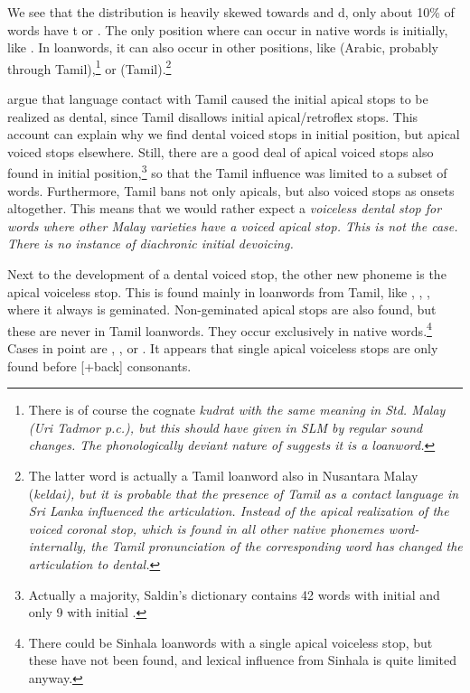 We see that the distribution is heavily skewed towards \dentt{} and d, only about 10\% of  words have t or \dentd{}.
The only position where \dentd{} can occur in native words is initially, like . In loanwords, it can also occur in other positions, like  (Arabic, probably through Tamil),\footnote{There is of course the cognate \em kudrat \em with the same meaning in Std. Malay (Uri Tadmor p.c.), but this should have given  in SLM by regular sound changes. The phonologically deviant nature of  suggests it is a loanword.} or  (Tamil).\footnote{The latter word is actually a Tamil loanword also in Nusantara Malay (\em keldai\em), but it is probable that the presence of Tamil as a contact language in Sri Lanka influenced the articulation. Instead of the apical realization of the voiced coronal stop, which is found in all other native phonemes word-internally, the Tamil pronunciation of the corresponding word has changed the articulation to dental.}

\citet{SmithEtAl2004}  argue that language contact with Tamil caused the initial apical stops to be realized as dental, since Tamil disallows initial apical/retroflex stops. This account can explain why we find dental voiced stops in initial position, but apical voiced stops elsewhere. Still, there are a good deal of apical voiced stops also found in initial position,\footnote{Actually a majority, Saldin's dictionary \citep{Saldin2007Dico} contains 42 words with initial \graphem{\dz} and only 9 with initial \graphem{\dentd}.} so that the Tamil influence was limited to a subset of words. Furthermore, Tamil bans not only apicals, but also voiced stops as onsets altogether. This means that we would rather expect a \em voiceless \em dental stop for words where other Malay varieties have a voiced apical stop. This is not the case. There is no instance of diachronic initial devoicing.

Next to the development of a dental voiced stop, the other new phoneme is the apical voiceless stop. This is found mainly in loanwords from Tamil, like , , , where it always is geminated. Non-geminated apical stops are also found, but these are never in Tamil loanwords. They occur exclusively  in native words.\footnote{There could be Sinhala loanwords with a single apical voiceless stop, but these have not been found, and lexical influence from Sinhala is quite limited anyway.} Cases in point are , ,  or . It appears that single apical voiceless stops are only found before [+back] consonants.

